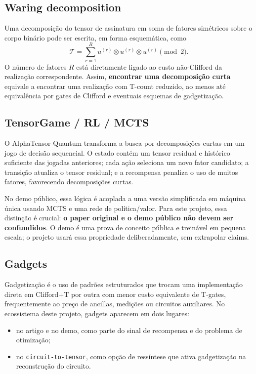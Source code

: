 \documentclass[a4paper,11pt]{article}
\begin{document}
\subsection*{Waring decomposition}

Uma decomposição do tensor de assinatura em soma de fatores simétricos sobre o corpo binário pode ser escrita, em forma esquemática, como
\[
\mathcal{T} = \sum_{r=1}^{R} u^{(r)} \otimes u^{(r)} \otimes u^{(r)} \pmod 2.
\]
O número de fatores $R$ está diretamente ligado ao custo não-Clifford da realização correspondente. Assim, \textbf{encontrar uma decomposição curta} equivale a encontrar uma realização com T-count reduzido, ao menos até equivalência por gates de Clifford e eventuais esquemas de gadgetização.

\subsection*{TensorGame / RL / MCTS}

O AlphaTensor-Quantum transforma a busca por decomposições curtas em um jogo de decisão sequencial. O estado contém um tensor residual e histórico suficiente das jogadas anteriores; cada ação seleciona um novo fator candidato; a transição atualiza o tensor residual; e a recompensa penaliza o uso de muitos fatores, favorecendo decomposições curtas.

No demo público, essa lógica é acoplada a uma versão simplificada em máquina única usando MCTS e uma rede de política/valor. Para este projeto, essa distinção é crucial: \textbf{o paper original e o demo público não devem ser confundidos}. O demo é uma prova de conceito pública e treinável em pequena escala; o projeto usará essa propriedade deliberadamente, sem extrapolar claims.

\subsection*{Gadgets}

Gadgetização é o uso de padrões estruturados que trocam uma implementação direta em Clifford+T por outra com menor custo equivalente de T-gates, frequentemente ao preço de ancillas, medições ou circuitos auxiliares. No ecossistema deste projeto, gadgets aparecem em dois lugares:
\begin{itemize}
  \item no artigo e no demo, como parte do sinal de recompensa e do problema de otimização;
  \item no \texttt{circuit-to-tensor}, como opção de ressíntese que ativa gadgetização na reconstrução do circuito.
\end{itemize}
\end{document}
